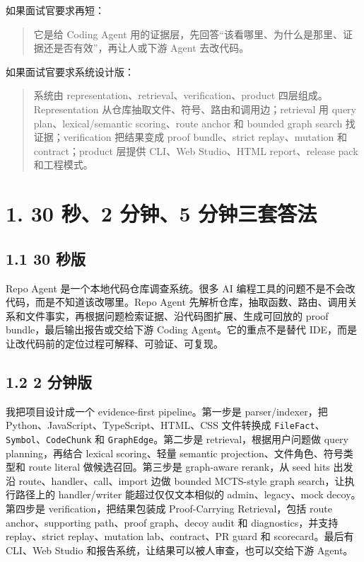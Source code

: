\documentclass[UTF8,12pt,openany]{ctexbook}
\begin{document}
如果面试官要求再短：\par

\begin{quote}
它是给 Coding Agent 用的证据层，先回答“该看哪里、为什么是那里、证据还是否有效”，再让人或下游 Agent 去改代码。
\end{quote}

如果面试官要求系统设计版：\par

\begin{quote}
系统由 representation、retrieval、verification、product 四层组成。Representation 从仓库抽取文件、符号、路由和调用边；retrieval 用 query plan、lexical/semantic scoring、route anchor 和 bounded graph search 找证据；verification 把结果变成 proof bundle、strict replay、mutation 和 contract；product 层提供 CLI、Web Studio、HTML report、release pack 和工程模式。
\end{quote}

\section{1. 30 秒、2 分钟、5 分钟三套答法}

\subsection{1.1 30 秒版}

Repo Agent 是一个本地代码仓库调查系统。很多 AI 编程工具的问题不是不会改代码，而是不知道该改哪里。Repo Agent 先解析仓库，抽取函数、路由、调用关系和文件事实，再根据问题检索证据、沿代码图扩展、生成可回放的 proof bundle，最后输出报告或交给下游 Coding Agent。它的重点不是替代 IDE，而是让改代码前的定位过程可解释、可验证、可复现。\par

\subsection{1.2 2 分钟版}

我把项目设计成一个 evidence-first pipeline。第一步是 parser/indexer，把 Python、JavaScript、TypeScript、HTML、CSS 文件转换成 \texttt{FileFact}、\texttt{Symbol}、\texttt{CodeChunk} 和 \texttt{GraphEdge}。第二步是 retrieval，根据用户问题做 query planning，再结合 lexical scoring、轻量 semantic projection、文件角色、符号类型和 route literal 做候选召回。第三步是 graph-aware rerank，从 seed hits 出发沿 route、handler、call、import 边做 bounded MCTS-style graph search，让执行路径上的 handler/writer 能超过仅仅文本相似的 admin、legacy、mock decoy。第四步是 verification，把结果包装成 Proof-Carrying Retrieval，包括 route anchor、supporting path、proof graph、decoy audit 和 diagnostics，并支持 replay、strict replay、mutation lab、contract、PR guard 和 scorecard。最后有 CLI、Web Studio 和报告系统，让结果可以被人审查，也可以交给下游 Agent。\par
\end{document}
